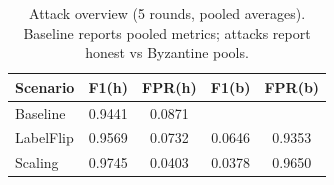 \begin{table}[!t]
\centering
\caption{Attack overview (5 rounds, pooled averages). Baseline reports pooled metrics; attacks report honest vs Byzantine pools.}
\label{tab:security_dependability}
\footnotesize
\setlength{\tabcolsep}{3.8pt}
\renewcommand{\arraystretch}{1.06}
\begin{tabular}{lcccc}
\toprule
\textbf{Scenario} & \textbf{F1(h)} & \textbf{FPR(h)} & \textbf{F1(b)} & \textbf{FPR(b)}\\
\midrule
Baseline & 0.9441 & 0.0871 &  &  \\
LabelFlip & 0.9569 & 0.0732 & 0.0646 & 0.9353 \\
Scaling & 0.9745 & 0.0403 & 0.0378 & 0.9650 \\
\bottomrule
\end{tabular}
\end{table}
